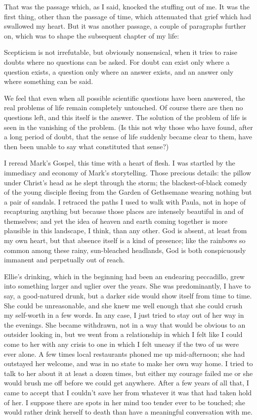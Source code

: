 That was the passage which, as I said, knocked the stuffing out of me. It was the first thing, other than the passage of time, which attenuated that grief which had swallowed my heart. But it was another passage, a couple of paragraphs further on, which was to shape the subsequent chapter of my life:

\begin{quoting}
    Scepticism is not irrefutable, but obviously nonsensical, when it tries to raise doubts where no questions can be asked. For doubt can exist only where a question exists, a question only where an answer exists, and an answer only where something can be said.

    We feel that even when all possible scientific questions have been answered, the real problems of life remain completely untouched. Of course there are then no questions left, and this itself is the answer. The solution of the problem of life is seen in the vanishing of the problem. (Is this not why those who have found, after a long period of doubt, that the sense of life suddenly became clear to them, have then been unable to say what constituted that sense?)
\end{quoting}

I reread Mark's Gospel, this time with a heart of flesh. I was startled by the immediacy and economy of Mark's storytelling. Those precious details: the pillow under Christ's head as he slept through the storm; the blackest-of-black comedy of the young disciple fleeing from the Garden of Gethsemane wearing nothing but a pair of sandals. I retraced the paths I used to walk with Paula, not in hope of recapturing anything but because those places are intensely beautiful in and of themselves; and yet the idea of heaven and earth coming together is more plausible in this landscape, I think, than any other. God is absent, at least from my own heart, but that absence itself is a kind of presence; like the rainbows so common among these rainy, sun-bleached headlands, God is both conspicuously immanent and perpetually out of reach.

Ellie's drinking, which in the beginning had been an endearing peccadillo, grew into something larger and uglier over the years. She was predominantly, I have to say, a good-natured drunk, but a darker side would show itself from time to time. She could be unreasonable, and she knew me well enough that she could crush my self-worth in a few words. In any case, I just tried to stay out of her way in the evenings. She became withdrawn, not in a way that would be obvious to an outsider looking in, but we went from a relationship in which I felt like I could come to her with any crisis to one in which I felt uneasy if the two of us were ever alone. A few times local restaurants phoned me up mid-afternoon; she had outstayed her welcome, and was in no state to make her own way home. I tried to talk to her about it at least a dozen times, but either my courage failed me or she would brush me off before we could get anywhere. After a few years of all that, I came to accept that I couldn't save her from whatever it was that had taken hold of her. I suppose there are spots in her mind too tender ever to be touched; she would rather drink herself to death than have a meaningful conversation with me.

